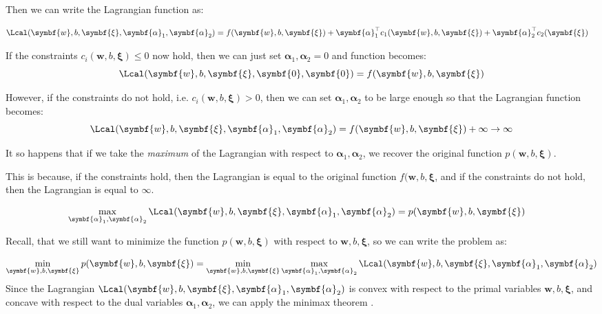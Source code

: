Then we can write the Lagrangian function as:

\begin{align*}
	\Lcal(\symbf{w}, b, \symbf{\xi}, \symbf{\alpha}_1, \symbf{\alpha}_2) & = f(\symbf{w}, b, \symbf{\xi}) + \symbf{\alpha}_1^\top c_1(\symbf{w}, b, \symbf{\xi}) + \symbf{\alpha}_2^\top c_2(\symbf{\xi})
\end{align*}

If the constraints \(c_i(\symbf{w}, b, \symbf{\xi}) \leq 0\) now hold, then we can just set \(\symbf{\alpha}_1, \symbf{\alpha}_2 = 0\) and function becomes:
\[
	\Lcal(\symbf{w}, b, \symbf{\xi}, \symbf{0}, \symbf{0}) = f(\symbf{w}, b, \symbf{\xi})
\]

However, if the constraints do not hold, i.e. \(c_i(\symbf{w}, b, \symbf{\xi}) > 0\), then we can set \(\symbf{\alpha}_1, \symbf{\alpha}_2\) to be large enough so that the Lagrangian function becomes:
\[
	\Lcal(\symbf{w}, b, \symbf{\xi}, \symbf{\alpha}_1, \symbf{\alpha}_2) = f(\symbf{w}, b, \symbf{\xi}) + \infty \to \infty
\]

It so happens that if we take the \emph{maximum} of the Lagrangian with respect to \(\symbf{\alpha}_1, \symbf{\alpha}_2\), we recover the original function \(p(\symbf{w}, b, \symbf{\xi})\).

This is because, if the constraints hold, then the Lagrangian is equal to the original function \(f(\symbf{w}, b, \symbf{\xi}\), and if the constraints do not hold, then the Lagrangian is equal to \(\infty\).

\begin{align*}
	\max_{\symbf{\alpha}_1, \symbf{\alpha}_2} \Lcal(\symbf{w}, b, \symbf{\xi}, \symbf{\alpha}_1, \symbf{\alpha}_2) & = p(\symbf{w}, b, \symbf{\xi})
\end{align*}

Recall, that we still want to minimize the function \(p(\symbf{w}, b, \symbf{\xi})\) with respect to \(\symbf{w}, b, \symbf{\xi}\), so we can write the problem as:

\[
	\min_{\symbf{w}, b, \symbf{\xi}} p(\symbf{w}, b, \symbf{\xi}) = \min_{\symbf{w}, b, \symbf{\xi}} \max_{\symbf{\alpha}_1, \symbf{\alpha}_2} \Lcal(\symbf{w}, b, \symbf{\xi}, \symbf{\alpha}_1, \symbf{\alpha}_2)
\]
Since the Lagrangian \(\Lcal(\symbf{w}, b, \symbf{\xi}, \symbf{\alpha}_1, \symbf{\alpha}_2)\) is convex with respect to the primal variables \(\symbf{w}, b, \symbf{\xi}\),
and concave with respect to the dual variables \(\symbf{\alpha}_1, \symbf{\alpha}_2\),
we can apply the minimax theorem \cite{vonNeumann1928}.

